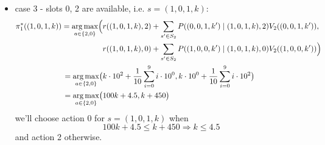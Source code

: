\documentclass{assignmeownt}
\DeclareMathOperator*{\argmax}{arg\,max}
\begin{document}
\begin{enumerate}
\begin{itemize}
    \item{case 3 - slots 0, 2 are available, i.e. $s=(1, 0, 1, k)$:}
    \begin{equation}
        \begin{aligned}
            \pi^*_1((1, 0, 1, k)) = \argmax_{a \in \{2,0\}} \Bigl(
            &r((1, 0, 1, k), 2) + \sum_{s' \in S_2} P((0, 0, 1, k') \mid (1, 0, 1, k), 2) V_2((0, 0, 1, k')) , \\
            &r((1, 0, 1, k), 0) + \sum_{s' \in S_2} P((1, 0, 0, k') \mid (1, 0, 1, k), 0) V_2((1, 0, 0, k'))
            \Bigr) \\ 
            = \argmax_{a \in \{2,0\}} \bigl(
            &k \cdot 10^2 + \frac{1}{10} \sum_{i=0}^{9} i \cdot 10^0,
            k \cdot 10^0 + \frac{1}{10} \sum_{i=0}^{9} i \cdot 10^2
            \bigr) \\
            = \argmax_{a \in \{2,0\}} \bigl(
            &100k + 4.5, k + 450
            \bigr) \\
        \end{aligned}
    \end{equation}
    \newline
    we'll choose action 0 for $s=(1, 0, 1, k)$ when
    \newline
    \begin{equation}
        100k + 4.5 \leq k + 450 \Rightarrow k \leq 4.5
    \end{equation}
    \newline
    and action 2 otherwise.
\end{itemize} 


\end{enumerate}
\end{document}
